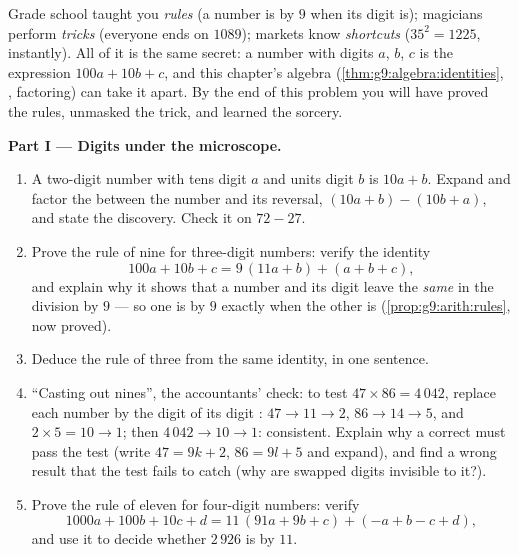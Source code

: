 \begin{problem}
\label{pb:g9:algebra:1}
Grade school taught you \emph{rules} (a number is  by
$9$ when its digit  is); magicians perform \emph{tricks}
(everyone ends on $1089$); markets know \emph{shortcuts}
($35^2 = 1225$, instantly). All of it is the same secret: a
number with digits $a$, $b$, $c$ is the expression
$100a + 10b + c$, and this chapter's algebra
(\cref{thm:g9:algebra:identities}, , factoring) can take
it apart. By the end of this problem you will have proved the
rules, unmasked the trick, and learned the sorcery.

\medskip
\noindent\textbf{Part I --- Digits under the microscope.}
\begin{enumerate}
  \item A two-digit number with tens digit $a$ and units digit
        $b$ is $10a + b$. Expand and factor the 
        between the number and its reversal,
        $(10a + b) - (10b + a)$, and state the discovery. Check
        it on $72 - 27$.
  \item Prove the rule of nine for three-digit numbers: verify
        the identity
        \[
        100a + 10b + c = 9\,(11a + b) + (a + b + c),
        \]
        and explain why it shows that a number and its digit 
        leave the \emph{same } in the division by $9$
        --- so one is  by $9$ exactly when the other is
        (\cref{prop:g9:arith:rules}, now proved).
  \item Deduce the rule of three from the same identity, in one
        sentence.
  \item ``Casting out nines'', the accountants' check: to test
        $47 \times 86 = 4\,042$, replace each number by the
        digit  of its digit : $47 \to 11 \to 2$,
        $86 \to 14 \to 5$, and $2 \times 5 = 10 \to 1$; then
        $4\,042 \to 10 \to 1$: consistent. Explain why a correct
         must pass the test (write $47 = 9k + 2$,
        $86 = 9l + 5$ and expand), and find a wrong result that
        the test fails to catch (why are swapped digits
        invisible to it?).
  \item Prove the rule of eleven for four-digit numbers: verify
        \[
        1000a + 100b + 10c + d
        = 11\,(91a + 9b + c) + (- a + b - c + d),
        \]
        and use it to decide whether $2\,926$ is  by
        $11$.
\end{enumerate}


\end{problem}
